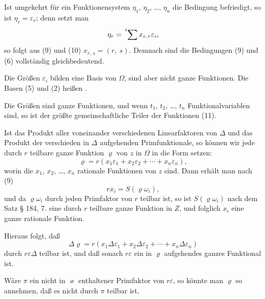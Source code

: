 
Ist umgekehrt für ein Funktionensystem $\eta_1$, $\eta_2$, \dots, $\eta_n$ die
Bedingung
befriedigt, so ist $\eta_r = \varepsilon_r$; denn setzt man
\[ \eta_r = \sideset{^i}{}\sum x_{i,\,r}\varepsilon_i, \]
so folgt aus (9) und (10) $x_{r,\,s} = (r,\ s)$. Demnach sind die Be\-dingungen
(9) und (6) vollständig gleichbedeutend.

Die Größen $\varepsilon_i$ bilden eine Basis von $\Omega$, sind aber nicht
ganze Funktionen. Die Basen (5) und (2) heißen .

Die Größen
sind ganze Funktionen, und wenn $t_1$, $t_2$, \dots, $t_n$ Funktionalvariablen
sind, so ist
der größte gemeinschaftliche Teiler der Funktionen (11).

Ist
das Produkt aller voneinander verschiedenen Linearfaktoren von
$\Delta$ und
das Produkt der verschieden in $\Delta$ aufgehenden Primfunktionale,
so können wir jede durch $r$ teilbare ganze Funktion $\varrho$ von $z$
in $\Omega$ in die Form setzen:
\[ \varrho = r(x_1\varepsilon_1 + x_2\varepsilon_2 + \cdots + x_n\varepsilon_n), \]
worin die $x_1$, $x_2$, \dots, $x_n$ rationale Funktionen von $z$ sind. Dann
erhält man nach (9)
\[ rx_i = S(\varrho\omega_i), \]
und da $\varrho\omega_i$ durch jeden Primfaktor von $r$ teilbar ist, so ist
$S(\varrho\omega_i)$ nach dem Satz § 184, 7. eine durch $r$ teilbare ganze
Funktion in $Z$,
und folglich $x_i$ eine ganze rationale Funktion.

Hieraus folgt, daß
\[ \Delta\varrho = r(x_1\Delta\varepsilon_1 + x_2\Delta\varepsilon_2 + \cdots + x_n\Delta\varepsilon_n) \]
durch $r\varepsilon\Delta$ teilbar ist, und daß sonach $r\varepsilon$ ein in $\varrho$ aufgehendes
ganzes Funktional ist.

Wäre $\pi$ ein nicht in $\varkappa$ enthaltener Primfaktor von $r\varepsilon$, so
könnte man $\varrho$ so annehmen, daß es nicht durch $\pi$ teilbar ist,
